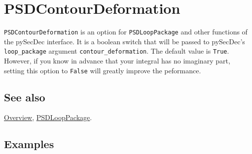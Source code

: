 \documentclass[../FeynHelpersManual.tex]{subfiles}
\begin{document}
\hypertarget{psdcontourdeformation}{
\section{PSDContourDeformation}\label{psdcontourdeformation}}

\texttt{PSDContourDeformation} is an option for \texttt{PSDLoopPackage}
and other functions of the pySecDec interface. It is a boolean switch
that will be passed to pySecDec's \texttt{loop_package} argument
\texttt{contour_deformation}. The default value is \texttt{True}.
However, if you know in advance that your integral has no imaginary
part, setting this option to \texttt{False} will greatly improve the
peformance.

\subsection{See also}

\hyperlink{toc}{Overview}, \hyperlink{psdlooppackage}{PSDLoopPackage}.

\subsection{Examples}
\end{document}
